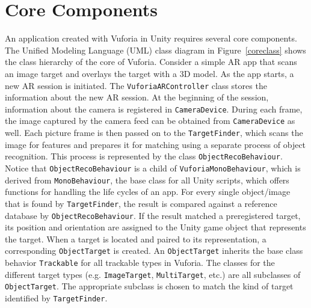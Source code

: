 \section{Core Components}
\begin{figure}[!ht]
\end{figure}

An application created with Vuforia in Unity requires several core components. The Unified Modeling Language (UML) class diagram in Figure~\ref{coreclass} shows the class hierarchy of the core of Vuforia. Consider a simple AR app that scans an image target and overlays the target with a 3D model. As the app starts, a new AR session is initiated. The \texttt{VuforiaARController} class stores the information about the new AR session. At the beginning of the session, information about the camera is registered in \texttt{CameraDevice}. During each frame, the image captured by the camera feed can be obtained from \texttt{CameraDevice} as well. Each picture frame is then passed on to the \texttt{TargetFinder}, which scans the image for features and prepares it for matching using a separate process of object recognition. This process is represented by the class \texttt{ObjectRecoBehaviour}. Notice that \texttt{ObjectRecoBehaviour} is a child of \texttt{VuforiaMonoBehaviour}, which is derived from \texttt{MonoBehaviour}, the base class for all Unity scripts, which offers functions for handling the life cycles of an app. For every single object/image that is found by \texttt{TargetFinder}, the result is compared against a reference database by \texttt{ObjectRecoBehaviour}. If the result matched a preregistered target, its position and orientation are assigned to the Unity game object that represents the target. When a target is located and paired to its representation, a corresponding \texttt{ObjectTarget} is created. An \texttt{ObjectTarget} inherits the base class behavior \texttt{Trackable} for all trackable types in Vuforia. The classes for the different target types (e.g. \texttt{ImageTarget}, \texttt{MultiTarget}, etc.) are all subclasses of  \texttt{ObjectTarget}. The appropriate subclass is chosen to match the kind of target identified by \texttt{TargetFinder}.

